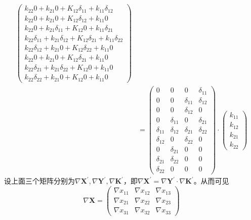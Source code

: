 \begin{enumerate}
\begin{equation}
\begin{aligned}
\begin{pmatrix}
			k_{22}0 + k_{21}0 + K_{12}\delta_{11}+k_{11}\delta_{12} \\
			k_{22}0 + k_{21}0 + K_{12}\delta_{12}+k_{11}0 \\
			k_{22}0 + k_{21}\delta_{11} + K_{12}0+k_{11}\delta_{21} \\
			k_{22}\delta_{11} + k_{21}\delta_{12} + K_{12}\delta_{21}+k_{11}\delta_{22} \\
			k_{22}\delta_{12} + k_{21}0 + K_{12}\delta_{22}+k_{11}0 \\
			k_{22}0 + k_{21}0 + K_{12}\delta_{21}+k_{11}0 \\
			k_{22}\delta_{21} + k_{21}\delta_{22} + K_{12}0+k_{11}0 \\
			k_{22}\delta_{22} + k_{21}0 + K_{12}0+k_{11}0 
		\end{pmatrix}\\
		&= \begin{pmatrix}
		0 & 0 & 0 & \delta_{11} \\ 
		0 & 0 & \delta_{11} & \delta_{12} \\ 
		0 & 0 & \delta_{12} & 0 \\ 
		0 & \delta_{11} & 0 & \delta_{21} \\ 
		\delta_{11} & \delta_{12} & \delta_{21} & \delta_{22} \\ 
		\delta_{12} & 0 & \delta_{22} & 0 \\ 
		0 & \delta_{21} & 0 & 0 \\ 
		\delta_{21} & \delta_{22} & 0 & 0 \\ 
		\delta_{22} & 0 & 0 & 0
		\end{pmatrix} \cdot 
		\begin{pmatrix}
			k_{11}\\ 
			k_{12}\\ 
			k_{21}\\ 
			k_{22}
		\end{pmatrix}
		\end{aligned}
	\end{equation}
	设上面三个矩阵分别为$\nabla \boldsymbol{X}^{'},\nabla \boldsymbol{Y}^{'},\nabla \boldsymbol{K}^{'}$，即$\nabla \boldsymbol{X}^{'}=\nabla \boldsymbol{Y}^{'}\cdot \nabla \boldsymbol{K}^{'}$。从而可见
	\begin{equation}
		\nabla \boldsymbol{X} = 
		\begin{pmatrix}
		\nabla x_{11}&\nabla  x_{12}&\nabla x_{13} \\ 
		\nabla x_{21}&\nabla  x_{22}&\nabla  x_{23}\\ 
		\nabla x_{31}&\nabla  x_{32}&\nabla x_{33}

\end{pmatrix}
\end{equation}
\end{enumerate}
